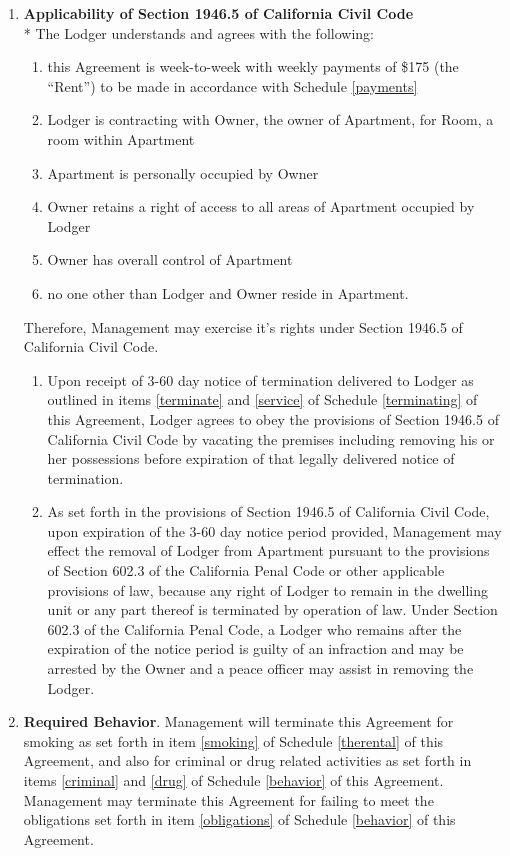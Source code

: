 \documentclass[]{article}
\newcommand{\behavior}{Required Behavior}
\newcommand{\management}{Management}
\newcommand{\apt}{Apartment}
\newcommand{\room}{Room}
\newcommand{\rent}{\$175}
\begin{document}
	\begin{enumerate}
		\item \textbf{Applicability of Section 1946.5 of California Civil Code}\\*
			The Lodger understands and agrees with the following:
			\begin{enumerate}
				\item this Agreement is week-to-week with weekly payments of \rent{} (the ``Rent'') to be made in accordance with Schedule \ref{payments}
				\item Lodger is contracting with Owner, the owner of \apt{}, for \room{}, a room within \apt{}
				\item \apt{} is personally occupied by Owner
				\item Owner retains a right of access to all areas of \apt{} occupied by Lodger 
				\item Owner has overall control of \apt{} 
				\item no one other than Lodger and Owner reside in \apt{}. 
			\end{enumerate}
			Therefore, \management{} may exercise it's rights under Section 1946.5 of California Civil Code.
			\begin{enumerate}
				\item Upon receipt of 3-60 day notice of termination delivered to Lodger as outlined in items \ref{terminate} and \ref{service} of Schedule \ref{terminating} of this Agreement, Lodger agrees to obey the provisions of Section 1946.5 of California Civil Code by vacating the premises including removing his or her possessions before expiration of that legally delivered notice of termination.
				\item As set forth in the provisions of Section 1946.5 of California Civil Code, upon expiration of the 3-60 day notice period provided, \management{} may effect the removal of Lodger from \apt{} pursuant to the provisions of Section 602.3 of the California Penal Code or other applicable provisions of law, because any right of Lodger to remain in the dwelling unit or any part thereof is terminated by operation of law. Under Section 602.3 of the California Penal Code, a Lodger who remains after the expiration of the notice period is guilty of an infraction and may be arrested by the Owner and a peace officer may assist in removing the Lodger.
			\end{enumerate} 

		\item \textbf{\behavior{}}.
			\management{} will terminate this Agreement for smoking as set forth in item \ref{smoking} of Schedule \ref{therental} of this Agreement, and also for criminal or drug related activities as set forth in items \ref{criminal} and \ref{drug} of Schedule \ref{behavior} of this Agreement. \management{} may terminate this Agreement for failing to meet the obligations set forth in item \ref{obligations} of Schedule \ref{behavior} of this Agreement.
	

\end{enumerate}
\end{document}
